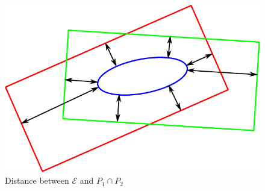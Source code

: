 %
\begin{figure}[!htb]
 \centering
 \includegraphics[width=0.4\columnwidth]{papers/IROS2014/figure/distance.pdf}
 \caption{Distance between $\mathcal{E}$ and $P_1 \cap P_2$}
 \label{fig:distance}
\end{figure}

